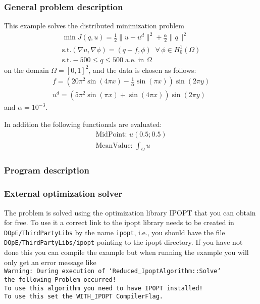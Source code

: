 \subsubsection{General problem description}
This example solves the distributed minimization problem
\begin{gather*}
\min J(q,u) = \frac{1}{2} \|u-u^d\|^2 + \frac{\alpha}{2}\|q\|^2\\
\text{s.t.} (\nabla u,\nabla \phi) = (q+f,\phi)\;\;\forall\,\phi \in H^1_0(\Omega)\\
\text{s.t.} -500 \le q \le 500\;\text{a.e. in }\Omega
\end{gather*}
on the domain $\Omega = [0,1]^2$, and the data is chosen as follows:
\begin{gather*}
 f = \left(20\pi^2  \sin(4 \pi x) - \frac{1}{\alpha}  \sin(\pi x)\right) \sin(2 \pi y)\\
 u^d = \left( 5 \pi^2 \sin(\pi x) + \sin(4 \pi x)\right)  \sin(2\pi y)
\end{gather*}
and $\alpha = 10^{-3}$.

In addition the following functionals are evaluated:
\begin{gather*}
  \text{MidPoint: } u(0.5 ; 0.5)\\[2mm]
  \text{MeanValue: }\int_\Omega u
\end{gather*}


\subsubsection{Program description}


\subsubsection{External optimization solver}
The problem is solved using the optimization library IPOPT that you can obtain for free. To use it 
a correct link to the ipopt library needs to be created in  {\tt DOpE/ThirdPartyLibs} by the name 
{\tt ipopt}, i.e., you should have the file
{\tt DOpE/ThirdPartyLibs/ipopt} pointing to the ipopt directory. If you have not done this you can compile the
example but when running the example you will only get an error message like\\
{\tt Warning: During execution of `Reduced\underline{ }IpoptAlgorithm::Solve`\\ the following Problem occurred!\\
To use this algorithm you need to have IPOPT installed! \\To use this set the WITH\underline{ }IPOPT CompilerFlag.}

